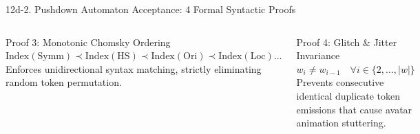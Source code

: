 \documentclass[aspectratio=169]{beamer}
\begin{document}
\begin{frame}[t]{12d-2. Pushdown Automaton Acceptance: 4 Formal Syntactic Proofs}
\begin{columns}[T]
    \begin{block}{Proof 3: Monotonic Chomsky Ordering}
        \fontsize{6.6pt}{8.4pt}\selectfont
        $\text{Index}(\text{Symm}) \prec \text{Index}(\text{HS}) \prec \text{Index}(\text{Ori}) \prec \text{Index}(\text{Loc}) \dots$\\
        Enforces unidirectional syntax matching, strictly eliminating random token permutation.
    \end{block}

    \begin{block}{Proof 4: Glitch \& Jitter Invariance}
        \fontsize{6.6pt}{8.4pt}\selectfont
        $w_i \neq w_{i-1} \quad \forall i \in \{2, \dots, |w|\}$\\
        Prevents consecutive identical duplicate token emissions that cause avatar animation stuttering.
    \end{block}
\end{columns}

\vspace{1.2mm}
\centering
{}
\end{frame}
\end{document}
